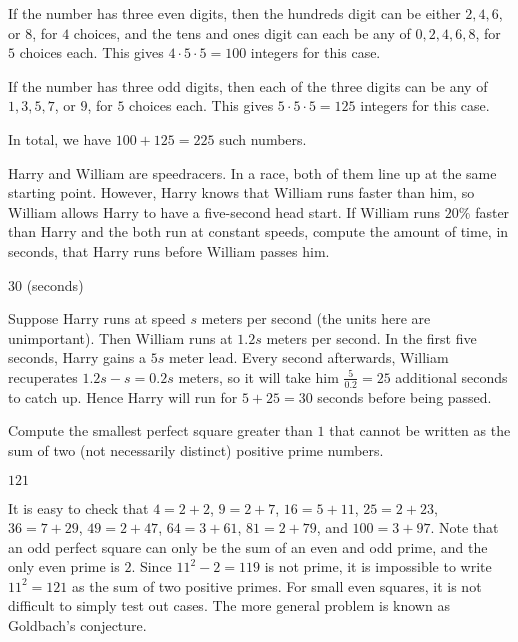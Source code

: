 \documentclass[11pt]{article}
\begin{document}
\begin{solution}
If the number has three even digits, then the hundreds digit can be either $2, 4, 6$, or $8$, for $4$ choices,
and the tens and ones digit can each be any of $0, 2, 4, 6, 8$, for $5$ choices each.
This gives $4 \cdot 5 \cdot 5 = 100$ integers for this case. \newline

If the number has three odd digits, then each of the three digits can be any of $1, 3, 5, 7$, or $9$, for
$5$ choices each. This gives $5 \cdot 5 \cdot 5 = 125$ integers for this case. \newline

In total, we have $100 + 125 = \boxed{225}$ such numbers.
\end{solution}


\begin{problem}%
Harry and William are speedracers. In a race, both of them line up at the same starting point.
However, Harry knows that William runs faster than him, so William allows Harry to have
a five-second head start. If William runs $20\%$ faster than Harry and the both run at
constant speeds, compute the amount of time, in seconds, that Harry runs before William passes him.
\end{problem}

\begin{answer}
$\boxed{30}$ (seconds)
\end{answer}

\begin{solution}
Suppose Harry runs at speed $s$ meters per second (the units here are unimportant). Then William
runs at $1.2s$ meters per second. In the first five seconds, Harry gains a $5s$ meter lead.
Every second afterwards, William recuperates $1.2s - s = 0.2s$ meters, so it will take
him $\frac{5}{0.2} = 25$ additional seconds to catch up. Hence Harry will run for $5 + 25 = \boxed{30}$
seconds before being passed.
\end{solution}


\begin{problem}%
Compute the smallest perfect square greater than $1$ that cannot be written as the sum of two
(not necessarily distinct) positive prime numbers.
\end{problem}

\begin{answer}
$\boxed{121}$
\end{answer}

\begin{solution}
It is easy to check that $4 = 2+2$, $9 = 2+7$, $16 = 5+11$, $25 = 2+23$, $36 = 7+29$, $49 = 2+47$,
$64 = 3+61$, $81 = 2+79$, and $100 = 3+97$. Note that an odd perfect square can only be the
sum of an even and odd prime, and the only even prime is $2$. Since $11^2 - 2 = 119$ is not prime,
it is impossible to write $11^2 = \boxed{121}$ as the sum of two positive primes.
For small even squares, it is not difficult to simply test out cases. The more general problem
is known as Goldbach's conjecture.
\end{solution}
\end{document}

